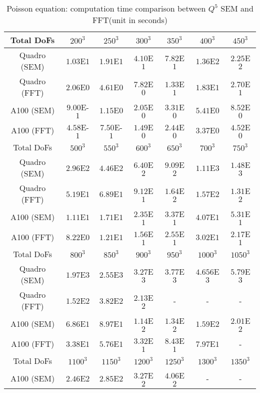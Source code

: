 \begin{table}[ht!]
    \centering
    \begin{tabular}{|c|c|c|c|c|c|c|}
    \hline
         Total DoFs & $200^3$ & $250^3$ & $300^3$ & $350^3$ & $400^3$ & $450^3$\\
    \hline
         Quadro (SEM) & $1.03$E$1$ & $1.91$E$1$ & $4.10$E$1$ & $7.82$E$1$ & $1.36$E$2$ &
         $2.25$E$2$\\
    \hline
         Quadro (FFT) & $2.06$E$0$ & $4.61$E$0$ & $7.82$E$0$ & $1.33$E$1$ & $1.83$E$1$ &
         $2.70$E$1$\\
    \hline
         A100 (SEM) & $9.00$E-$1$ & $1.15$E$0$ & $2.05$E$0$ & $3.31$E$0$ & $5.41$E$0$ &
         $8.52$E$0$\\
    \hline
         A100 (FFT) & $4.58$E-$1$ & $7.50$E-$1$ & $1.49$E$0$ & $2.44$E$0$ & $3.37$E$0$ &
         $4.52$E$0$\\
    \hline
    \hline
         Total DoFs & $500^3$ & $550^3$ & $600^3$ & $650^3$ & $700^3$ & $750^3$\\
    \hline
         Quadro (SEM) & $2.96$E$2$ & $4.46$E$2$ & $6.40$E$2$ & $9.09$E$2$ & $1.11$E$3$ &
         $1.48$E$3$\\
    \hline
         Quadro (FFT) & $5.19$E$1$ & $6.89$E$1$ & $9.12$E$1$ & $1.64$E$2$ & $1.57$E$2$ &
         $1.31$E$2$\\
    \hline
         A100 (SEM) & $1.11$E$1$ & $1.71$E$1$ & $2.35$E$1$ & $3.37$E$1$ & $4.07$E$1$ &
         $5.31$E$1$\\
    \hline
         A100 (FFT) & $8.22$E$0$ & $1.21$E$1$ & $1.56$E$1$ & $2.55$E$1$ & $3.02$E$1$ & $2.17$E$1$\\
    \hline
    \hline
         Total DoFs & $800^3$ & $850^3$ & $900^3$ & $950^3$ & $1000^3$ & $1050^3$\\
    \hline
         Quadro (SEM) & $1.97$E$3$ & $2.55$E$3$ & $3.27$E$3$ & $3.77$E$3$ & $4.656$E$3$ & $5.79$E$3$\\
    \hline
         Quadro (FFT) & $1.52$E$2$ & $3.82$E$2$ & $2.13$E$2$ & - & - & -\\
    \hline
         A100 (SEM) & $6.86$E$1$ & $8.97$E$1$ & $1.14$E$2$ & $1.34$E$2$ & $1.59$E$2$ &
         $2.01$E$2$\\
    \hline
         A100 (FFT) & $3.38$E$1$ & $5.76$E$1$ & $3.32$E$1$ & $8.43$E$1$ & $7.97$E$1$ & -\\
    \hline
    \hline
         Total DoFs & $1100^3$ & $1150^3$ & $1200^3$ & $1250^3$ & $1300^3$ & $1350^3$\\
    \hline
         A100 (SEM) & $2.46$E$2$ & $2.85$E$2$ & $3.27$E$2$ & $4.06$E$2$ & - & -\\
    \hline
    \end{tabular}
    \caption{Poisson equation: computation time comparison between $Q^5$ SEM and FFT(unit in seconds)}
    \label{tab4: poisson_FFT_SEM}
\end{table}

